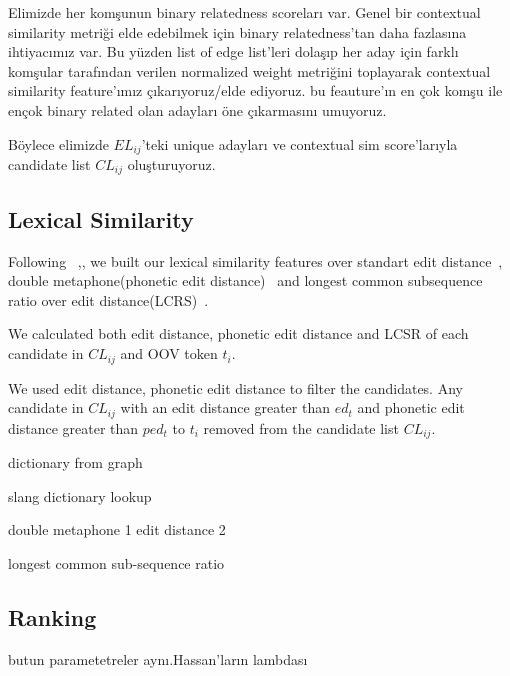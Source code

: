 Elimizde her komşunun binary relatedness scoreları var. Genel bir contextual similarity metriği elde edebilmek için binary relatedness'tan daha fazlasına ihtiyacımız var. Bu yüzden list of edge list'leri dolaşıp her aday için farklı komşular tarafından verilen normalized weight metriğini toplayarak contextual similarity feature'ımız çıkarıyoruz/elde ediyoruz. bu feauture'ın en çok komşu ile ençok binary related olan adayları öne çıkarmasını umuyoruz.

Böylece elimizde $EL_{ij}$'teki unique adayları ve contextual sim score'larıyla candidate list $CL_{ij}$ oluşturuyoruz.

\subsection{Lexical Similarity}

Following ~\cite{Han:2011:LNS:2002472.2002520},\cite{DBLP:conf/acl/HassanM13}, we built our lexical similarity features over standart edit distance~\cite{levenshtein1966bcc}, double metaphone(phonetic edit distance)~\cite{Philips:2000:DMS:349124.349132} and longest common subsequence ratio over edit distance(LCRS)~\cite{Contractor:2010:UCN:1944566.1944588}.

We calculated both edit distance, phonetic edit distance and LCSR of each candidate in $CL_{ij}$ and OOV token $t_i$.

We used edit distance, phonetic edit distance to filter the candidates. Any candidate in $CL_{ij}$ with an edit distance greater than $ed_t$ and phonetic edit distance greater than $ped_t$ to $t_i$ removed from the candidate list $CL_{ij}$.


dictionary from graph

slang dictionary lookup

double metaphone 1
edit distance 2


longest common sub-sequence ratio



\subsection{Ranking}

butun parametetreler aynı.Hassan'ların lambdası
